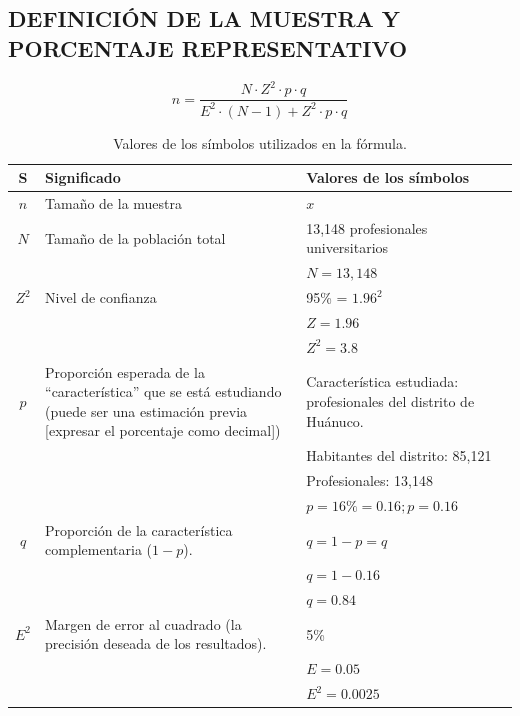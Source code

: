 \documentclass[12pt, a4paper]{article}
\renewcommand{\arraystretch}{1.5} %
\begin{document}
\subsection{DEFINICIÓN DE LA MUESTRA Y PORCENTAJE REPRESENTATIVO}

\[
n = \frac{N \cdot Z^2 \cdot p \cdot q}{E^2 \cdot (N - 1) + Z^2 \cdot p \cdot q}
\]

\begin{table}[H]
    \centering
    \renewcommand{\arraystretch}{1.5}
    \setlength{\tabcolsep}{10pt}
    \begin{tabular}{|c|p{7cm}|p{5cm}|}
        \hline
        \textbf{S} & \textbf{Significado} & \textbf{Valores de los símbolos} \\
        \hline
        $n$ & Tamaño de la muestra & $x$ \\
        \hline
        $N$ & Tamaño de la población total & 13,148 profesionales universitarios \\ 
            & & $N = 13,148$ \\
        \hline
        $Z^2$ & Nivel de confianza & 95\% = $1.96^2$ \\ 
            & & $Z = 1.96$ \\ 
            & & $Z^2 = 3.8$ \\
        \hline
        $p$ & Proporción esperada de la “característica” que se está estudiando (puede ser una estimación previa [expresar el porcentaje como decimal]) & Característica estudiada: profesionales del distrito de Huánuco. \\ 
            & & Habitantes del distrito: 85,121 \\ 
            & & Profesionales: 13,148 \\ 
            & & $p = 16\% = 0.16; p = 0.16$ \\
        \hline
        $q$ & Proporción de la característica complementaria ($1 - p$). & $q = 1 - p = q$ \\ 
            & & $q = 1 - 0.16$ \\ 
            & & $q = 0.84$ \\
        \hline
        $E^2$ & Margen de error al cuadrado (la precisión deseada de los resultados). & 5\% \\ 
            & & $E = 0.05$ \\ 
            & & $E^2 = 0.0025$ \\
        \hline
    \end{tabular}
    \caption{Valores de los símbolos utilizados en la fórmula.}
\end{table}
\end{document}
